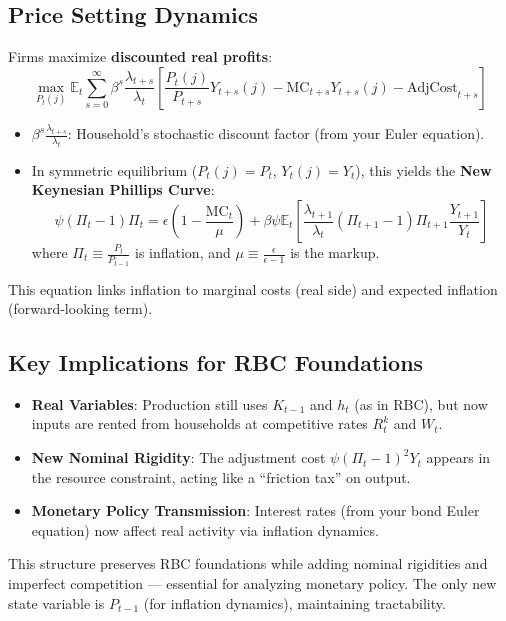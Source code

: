 \documentclass[11pt,preprint]{elsarticle}
\numberwithin{equation}{section}
\numberwithin{figure}{section}
\numberwithin{table}{section}
\begin{document}
\subsection{Price Setting Dynamics}\label{price-setting-dynamics}

Firms maximize \textbf{discounted real profits}: \[
\max_{P_t(j)} \mathbb{E}_t \sum_{s=0}^\infty \beta^s \frac{\lambda_{t+s}}{\lambda_t} \left[ 
\frac{P_t(j)}{P_{t+s}} Y_{t+s}(j) - \text{MC}_{t+s} Y_{t+s}(j) - \text{AdjCost}_{t+s} 
\right]
\]

\begin{itemize}
\item
  \(\beta^s \frac{\lambda_{t+s}}{\lambda_t}\): Household's stochastic
  discount factor (from your Euler equation).
\item
  In symmetric equilibrium (\(P_t(j) = P_t\), \(Y_t(j) = Y_t\)), this
  yields the \textbf{New Keynesian Phillips Curve}: \[
  \psi (\Pi_t - 1) \Pi_t = \epsilon \left(1 - \frac{\text{MC}_t}{\mu} \right) + \beta \psi \mathbb{E}_t \left[ \frac{\lambda_{t+1}}{\lambda_t} (\Pi_{t+1} - 1) \Pi_{t+1} \frac{Y_{t+1}}{Y_t} \right]
  \] where \(\Pi_t \equiv \frac{P_t}{P_{t-1}}\) is inflation, and
  \(\mu \equiv \frac{\epsilon}{\epsilon - 1}\) is the markup.
\end{itemize}

This equation links inflation to marginal costs (real side) and expected
inflation (forward-looking term).

\subsection{Key Implications for RBC
Foundations}\label{key-implications-for-rbc-foundations}

\begin{itemize}
\item
  \textbf{Real Variables}: Production still uses \(K_{t-1}\) and \(h_t\)
  (as in RBC), but now inputs are rented from households at competitive
  rates \(R_t^k\) and \(W_t\).
\item
  \textbf{New Nominal Rigidity}: The adjustment cost
  \(\psi (\Pi_t - 1)^2 Y_t\) appears in the resource constraint, acting
  like a ``friction tax'' on output.
\item
  \textbf{Monetary Policy Transmission}: Interest rates (from your bond
  Euler equation) now affect real activity via inflation dynamics.
\end{itemize}

This structure preserves RBC foundations while adding nominal rigidities
and imperfect competition --- essential for analyzing monetary policy.
The only new state variable is \(P_{t-1}\) (for inflation dynamics),
maintaining tractability.
\end{document}
